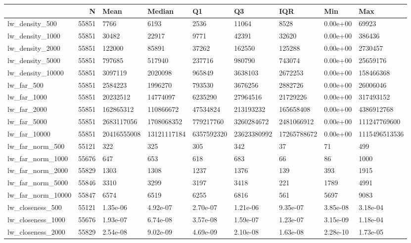 \begin{tabular}{lrlllllll}
\toprule
 & N & Mean & Median & Q1 & Q3 & IQR & Min & Max \\
\midrule
lw\_density\_500 & 55851 & 7766 & 6193 & 2536 & 11064 & 8528 & 0.00e+00 & 69923 \\
lw\_density\_1000 & 55851 & 30482 & 22917 & 9771 & 42391 & 32620 & 0.00e+00 & 386436 \\
lw\_density\_2000 & 55851 & 122000 & 85891 & 37262 & 162550 & 125288 & 0.00e+00 & 2730457 \\
lw\_density\_5000 & 55851 & 797685 & 517940 & 237716 & 980790 & 743074 & 0.00e+00 & 25659176 \\
lw\_density\_10000 & 55851 & 3097119 & 2020098 & 965849 & 3638103 & 2672253 & 0.00e+00 & 158466368 \\
lw\_far\_500 & 55851 & 2584223 & 1996270 & 793530 & 3676256 & 2882726 & 0.00e+00 & 26006046 \\
lw\_far\_1000 & 55851 & 20232512 & 14774097 & 6235290 & 27964516 & 21729226 & 0.00e+00 & 317493152 \\
lw\_far\_2000 & 55851 & 162865312 & 110866672 & 47534824 & 213193232 & 165658408 & 0.00e+00 & 4386912768 \\
lw\_far\_5000 & 55851 & 2683117056 & 1708068352 & 779217760 & 3260284672 & 2481066912 & 0.00e+00 & 111247769600 \\
lw\_far\_10000 & 55851 & 20416555008 & 13121117184 & 6357592320 & 23623380992 & 17265788672 & 0.00e+00 & 1115496513536 \\
lw\_far\_norm\_500 & 55121 & 322 & 325 & 305 & 342 & 37 & 71 & 499 \\
lw\_far\_norm\_1000 & 55676 & 647 & 653 & 618 & 683 & 66 & 86 & 1000 \\
lw\_far\_norm\_2000 & 55829 & 1303 & 1308 & 1237 & 1376 & 139 & 393 & 1915 \\
lw\_far\_norm\_5000 & 55846 & 3310 & 3299 & 3197 & 3418 & 221 & 1789 & 4991 \\
lw\_far\_norm\_10000 & 55847 & 6574 & 6519 & 6255 & 6816 & 561 & 5697 & 9083 \\
lw\_closeness\_500 & 55121 & 1.35e-06 & 4.92e-07 & 2.70e-07 & 1.21e-06 & 9.35e-07 & 3.85e-08 & 3.18e-04 \\
lw\_closeness\_1000 & 55676 & 1.93e-07 & 6.74e-08 & 3.57e-08 & 1.59e-07 & 1.23e-07 & 3.15e-09 & 1.18e-04 \\
lw\_closeness\_2000 & 55829 & 2.54e-08 & 9.02e-09 & 4.69e-09 & 2.10e-08 & 1.63e-08 & 2.28e-10 & 1.73e-05 \\

\end{tabular}
